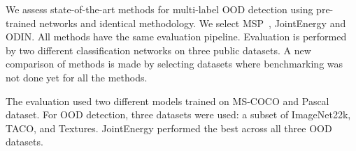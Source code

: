 We assess state-of-the-art methods for multi-label OOD detection using pre-trained networks and identical methodology.
We select MSP~\cite{Hendrycks2016}, JointEnergy\cite{Wang2021} and ODIN\cite{Liang2017}. 
All methods have the same evaluation pipeline. 
Evaluation is performed by two different classification networks on three public datasets. 
A new comparison of methods is made by selecting datasets where benchmarking was not done yet for all the methods.

The evaluation used two different models trained on MS-COCO\cite{linMicrosoftCOCOCommon2015} and Pascal\cite{everinghamPascalVisualObject2015} dataset. 
For OOD detection, three datasets were used: a subset of ImageNet22k\cite{dengImageNetLargescaleHierarchical2009}, TACO\cite{proencaTACOTrashAnnotations2020}, and Textures\cite{cimpoiDescribingTexturesWild2013}. 
JointEnergy performed the best across all three OOD datasets. 

